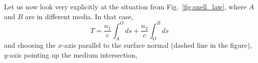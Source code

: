\documentclass[../class_mech_main.tex]{subfiles}
\begin{document}
\begin{ex}
    Let us now look very explicitly at the situation from Fig.~\ref{fig:snell_law}, where $A$ and $B$ are in different media. In that case,
    \begin{equation}
        T = \frac{n_1}{c} \int_A^O ds + \frac{n_2}{c} \int_O^B ds
    \end{equation}
    and choosing the $x$-axis parallel to the surface normal (dashed line in the figure), $y$-axis pointing up the medium intersection,

\end{ex}
\end{document}
